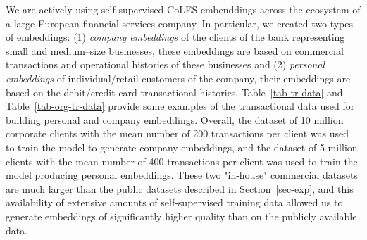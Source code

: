 \documentclass[sigconf]{acmart}
\begin{document}
We are actively using self-supervised CoLES embenddings across the ecosystem of a large European financial services company.
In particular, we created two types of embeddings: (1) \emph{company embeddings} of the clients of the bank representing small and medium--size businesses, these embeddings are based on commercial transactions and operational histories of these businesses and (2) \emph{personal embeddings} of individual/retail customers of the company, their embeddings are based on the debit/credit card transactional histories. Table~\ref{tab-tr-data} and Table~\ref{tab-org-tr-data} provide some examples of the transactional data used for building personal and company embeddings. Overall, the dataset of 10 million corporate clients with the mean number of 200 transactions per client was used to train the model to generate company embeddings, and the dataset of 5 million clients with the mean number of 400 transactions per client was used to train the model producing personal embeddings. These two "in-house" commercial datasets are much larger than the public datasets described in Section~\ref{sec-exp}, and this availability of extensive amounts of self-supervised training data allowed us to generate embeddings of significantly higher quality than on the publicly available data.
\end{document}

